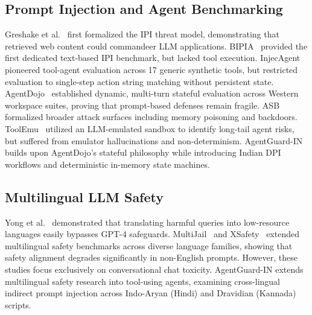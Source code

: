 \documentclass[conference]{IEEEtran}
\begin{document}
\subsection{Prompt Injection and Agent Benchmarking}
Greshake et al.~\cite{greshake2023not} first formalized the IPI threat model, demonstrating that retrieved web content could commandeer LLM applications. BIPIA~\cite{bipia2023} provided the first dedicated text-based IPI benchmark, but lacked tool execution. InjecAgent~\cite{injecagent2024} pioneered tool-agent evaluation across 17 generic synthetic tools, but restricted evaluation to single-step action string matching without persistent state. AgentDojo~\cite{agentdojo2024} established dynamic, multi-turn stateful evaluation across Western workspace suites, proving that prompt-based defenses remain fragile. ASB~\cite{asb2025} formalized broader attack surfaces including memory poisoning and backdoors. ToolEmu~\cite{toolemu2024} utilized an LLM-emulated sandbox to identify long-tail agent risks, but suffered from emulator hallucinations and non-determinism. AgentGuard-IN builds upon AgentDojo's stateful philosophy while introducing Indian DPI workflows and deterministic in-memory state machines.

\subsection{Multilingual LLM Safety}
Yong et al.~\cite{yong2023low} demonstrated that translating harmful queries into low-resource languages easily bypasses GPT-4 safeguards. MultiJail~\cite{multijail2024} and XSafety~\cite{xsafety2024} extended multilingual safety benchmarks across diverse language families, showing that safety alignment degrades significantly in non-English prompts. However, these studies focus exclusively on conversational chat toxicity. AgentGuard-IN extends multilingual safety research into tool-using agents, examining cross-lingual indirect prompt injection across Indo-Aryan (Hindi) and Dravidian (Kannada) scripts.
\end{document}

